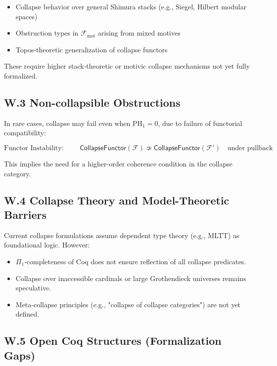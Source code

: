 \documentclass[11pt]{article}
\begin{document}
\begin{itemize}
  \item Collapse behavior over general Shimura stacks (e.g., Siegel, Hilbert modular spaces)
  \item Obstruction types in \( \mathcal{F}_{\mathrm{mot}} \) arising from mixed motives
  \item Topos-theoretic generalization of collapse functors
\end{itemize}

These require higher stack-theoretic or motivic collapse mechanisms not yet fully formalized.

\subsection*{W.3 Non-collapsible Obstructions}

In rare cases, collapse may fail even when \( \mathrm{PH}_1 = 0 \), due to failure of functorial compatibility:

\[
\text{Functor Instability: } \qquad \mathsf{CollapseFunctor}(\mathcal{F}) \not\simeq \mathsf{CollapseFunctor}(\mathcal{F}') \quad \text{under pullback}
\]

This implies the need for a higher-order coherence condition in the collapse category.

\subsection*{W.4 Collapse Theory and Model-Theoretic Barriers}

Current collapse formulations assume dependent type theory (e.g., MLTT) as foundational logic. However:

\begin{itemize}
  \item \( \Pi_1 \)-completeness of Coq does not ensure reflection of all collapse predicates.
  \item Collapse over inaccessible cardinals or large Grothendieck universes remains speculative.
  \item Meta-collapse principles (e.g., "collapse of collapse categories") are not yet defined.
\end{itemize}

\subsection*{W.5 Open Coq Structures (Formalization Gaps)}
\end{document}
